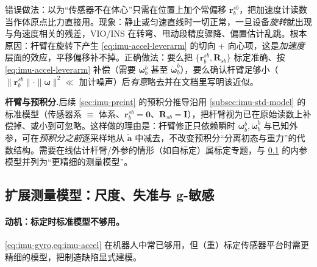 \begin{pitfall}
错误做法：以为“传感器不在体心”只需在位置上加个常偏移 $\mathbf r_b^{sb}$，把加速度计读数当作体原点比力直接用。现象：静止或匀速直线时一切正常，一旦设备\emph{旋转}就出现与角速度相关的残差，VIO/INS 在转弯、甩动段精度骤降、偏置估计乱跳。根本原因：杆臂在旋转下产生 \cref{eq:imu-accel-leverarm} 的切向 $+$ 向心项，这是\emph{加速度}层面的效应，平移偏移补不掉。正确做法：要么把 $\{\mathbf r_b^{sb},\mathbf R_{sb}\}$ 标定准确、按 \cref{eq:imu-accel-leverarm} 补偿（需要 $\boldsymbol\omega_b^b$ 甚至 $\dot{\boldsymbol\omega}_b^b$），要么确认杆臂足够小（$\|\mathbf r_b^{sb}\|\cdot\|\boldsymbol\omega\|^2\ll$ 加计噪声）后\emph{有意}略去并在文档里写明该近似。
\end{pitfall}

\begin{note}
\textbf{杆臂与预积分.}\;后续 \cref{sec:imu-preint} 的预积分推导沿用 \cref{subsec:imu-std-model} 的标准模型（传感器系 $\equiv$ 体系、$\mathbf r_b^{sb}=\mathbf 0$、$\mathbf R_{sb}=\mathbf I$），把杆臂视为已在原始读数上补偿掉、或小到可忽略。这样做的理由是：杆臂修正只依赖瞬时 $\boldsymbol\omega_b^b,\dot{\boldsymbol\omega}_b^b$ 与已知外参，可在\emph{预积分之前}逐采样地从 $\tilde{\mathbf a}$ 中减去，不改变预积分“分离初态与重力”的代数结构。需要在线估计杆臂/外参的情形（如自标定）属标定专题，与 \cref{subsec:imu-ext-model} 的内参模型并列为“更精细的测量模型”。
\end{note}

\subsection{扩展测量模型：尺度、失准与 g-敏感}
\label{subsec:imu-ext-model}

\paragraph{动机：标定时标准模型不够用。}
\cref{eq:imu-gyro,eq:imu-accel} 在机器人中常已够用，但（重）标定传感器平台时需更精细的模型，把制造缺陷显式建模。

